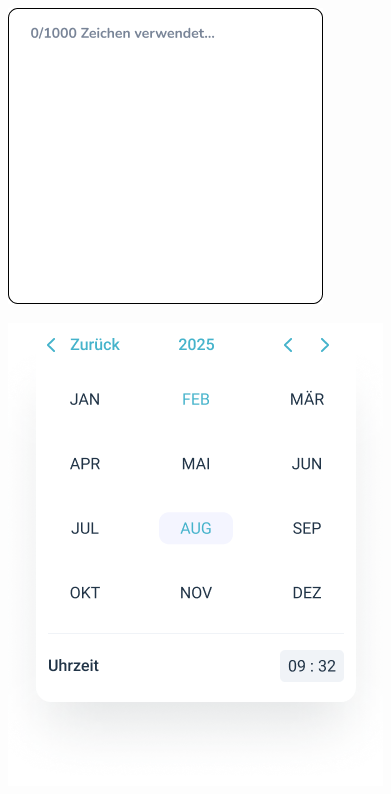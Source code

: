 \begin{figure}[h!]
	\centering
	\begin{minipage}{0.45\linewidth}
		\centering
		\includegraphics[width=\linewidth]{images/Inputfeld}
		\label{fig:inputfeld}
	\end{minipage}
	\hfill
	\begin{minipage}{0.45\linewidth}
		\centering
		\vspace{1.5cm} %
		\includegraphics[width=\linewidth]{images/Geburtsdatum}
		\label{fig:geburtsdatum}
	\end{minipage}
	

\end{figure}
